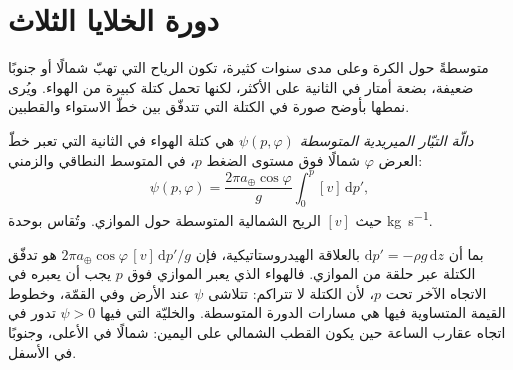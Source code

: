 \section{دورة الخلايا الثلاث}\label{sec:b1:atmospheric-circulation:cells}

متوسطةً حول الكرة وعلى مدى سنوات كثيرة، تكون الرياح التي تهبّ شمالًا أو جنوبًا ضعيفة، بضعة أمتار في الثانية على الأكثر، لكنها تحمل كتلة كبيرة من الهواء. ويُرى نمطها بأوضح صورة في الكتلة التي تتدفّق بين خطّ الاستواء والقطبين.

\begin{definition}\label{def:b1:atmospheric-circulation:streamfunction}
\emph{دالّة التيّار الميريدية المتوسطة}
$\psi(p, \varphi)$ هي كتلة الهواء في الثانية التي تعبر خطّ العرض
$\varphi$ شمالًا فوق مستوى الضغط $p$، في المتوسط النطاقي والزمني:
\[
  \psi(p, \varphi) = \frac{2\pi a_\oplus\cos\varphi}{g}\int_0^p [v]\,\mathrm dp' ,
\]
حيث $[v]$ الريح الشمالية المتوسطة حول الموازي. وتُقاس بوحدة \unit{kg.s^{-1}}.
\end{definition}

بما أن $\mathrm dp' = -\rho g\,\mathrm dz$ بالعلاقة الهيدروستاتيكية، فإن $2\pi a_\oplus
\cos\varphi\,[v]\,\mathrm dp'/g$ هو تدفّق الكتلة عبر حلقة من الموازي. فالهواء الذي يعبر الموازي فوق $p$ يجب أن يعبره في الاتجاه الآخر تحت $p$، لأن الكتلة لا تتراكم: تتلاشى $\psi$ عند الأرض وفي القمّة، وخطوط القيمة المتساوية فيها هي مسارات الدورة المتوسطة. والخليّة التي فيها $\psi > 0$ تدور في اتجاه عقارب الساعة حين يكون القطب الشمالي على اليمين: شمالًا في الأعلى، وجنوبًا في الأسفل.


